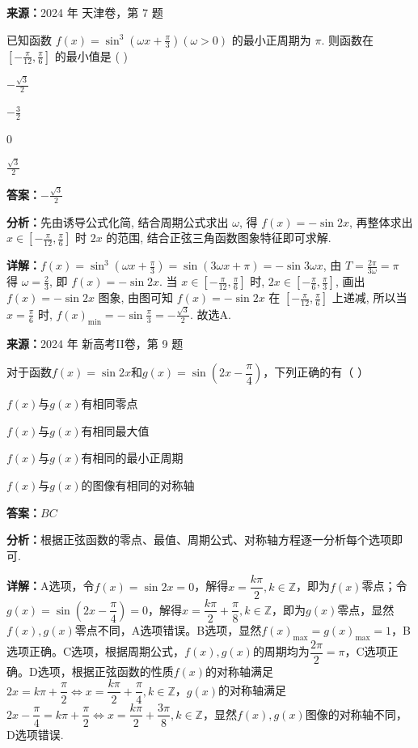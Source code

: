 \begin{question}[points=5]
\textbf{来源：}2024 年 天津卷，第 7 题\par
已知函数 $f(x)=\sin^3\left(\omega x + \frac{\pi}{3}\right) (\omega>0)$ 的最小正周期为 $\pi$. 则函数在 $\left[-\frac{\pi}{12},\frac{\pi}{6}\right]$ 的最小值是 ( )
\begin{choices}
  \item $-\frac{\sqrt{3}}{2}$
  \item $-\frac{3}{2}$
  \item $0$
  \item $\frac{\sqrt{3}}{2}$
\end{choices}
\begin{solution}
\textbf{答案：}$-\frac{\sqrt{3}}{2}$

\textbf{分析：}先由诱导公式化简, 结合周期公式求出 $\omega$, 得 $f(x)=-\sin 2x$, 再整体求出 $x\in\left[-\frac{\pi}{12},\frac{\pi}{6}\right]$ 时 $2x$ 的范围, 结合正弦三角函数图象特征即可求解.

\textbf{详解：}$f(x)=\sin^3\left(\omega x+\frac{\pi}{3}\right)=\sin(3\omega x+\pi)=-\sin 3\omega x$, 由 $T=\frac{2\pi}{3\omega}=\pi$ 得 $\omega=\frac{2}{3}$, 即 $f(x)=-\sin 2x$. 当 $x\in\left[-\frac{\pi}{12},\frac{\pi}{6}\right]$ 时, $2x\in\left[-\frac{\pi}{6},\frac{\pi}{3}\right]$, 画出 $f(x)=-\sin 2x$ 图象, 由图可知 $f(x)=-\sin 2x$ 在 $\left[-\frac{\pi}{12},\frac{\pi}{6}\right]$ 上递减, 所以当 $x=\frac{\pi}{6}$ 时, $f(x)_{\min}=-\sin\frac{\pi}{3}=-\frac{\sqrt{3}}{2}$. 故选A.
\end{solution}
\end{question}

\begin{question}[points=6]
\textbf{来源：}2024 年 新高考II卷，第 9 题\par
对于函数$f(x)=\sin 2x$和$g(x)=\sin(2x-\dfrac{\pi}{4})$，下列正确的有（ ）
\begin{choices}
  \item $f(x)$与$g(x)$有相同零点
  \item $f(x)$与$g(x)$有相同最大值
  \item $f(x)$与$g(x)$有相同的最小正周期
  \item $f(x)$与$g(x)$的图像有相同的对称轴
\end{choices}
\begin{solution}
\textbf{答案：}$BC$

\textbf{分析：}根据正弦函数的零点、最值、周期公式、对称轴方程逐一分析每个选项即可.

\textbf{详解：}A选项，令$f(x)=\sin 2x=0$，解得$x=\dfrac{k\pi}{2},k\in\mathbb{Z}$，即为$f(x)$零点；令$g(x)=\sin(2x-\dfrac{\pi}{4})=0$，解得$x=\dfrac{k\pi}{2}+\dfrac{\pi}{8},k\in\mathbb{Z}$，即为$g(x)$零点，显然$f(x),g(x)$零点不同，A选项错误。B选项，显然$f(x)_{\max}=g(x)_{\max}=1$，B选项正确。C选项，根据周期公式，$f(x),g(x)$的周期均为$\dfrac{2\pi}{2}=\pi$，C选项正确。D选项，根据正弦函数的性质$f(x)$的对称轴满足$2x=k\pi+\dfrac{\pi}{2}\Leftrightarrow x=\dfrac{k\pi}{2}+\dfrac{\pi}{4},k\in\mathbb{Z}$，$g(x)$的对称轴满足$2x-\dfrac{\pi}{4}=k\pi+\dfrac{\pi}{2}\Leftrightarrow x=\dfrac{k\pi}{2}+\dfrac{3\pi}{8},k\in\mathbb{Z}$，显然$f(x),g(x)$图像的对称轴不同，D选项错误.
\end{solution}
\end{question}

